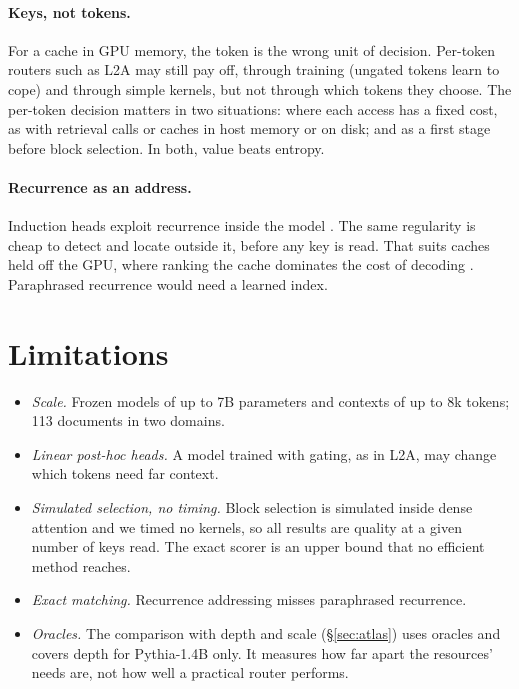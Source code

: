 \documentclass[11pt]{article}
\begin{document}
\paragraph{Keys, not tokens.} For a cache in GPU memory, the token is the wrong unit of decision. Per-token routers such as L2A may still pay off, through training (ungated tokens learn to cope) and through simple kernels, but not through which tokens they choose. The per-token decision matters in two situations: where each access has a fixed cost, as with retrieval calls or caches in host memory or on disk; and as a first stage before block selection. In both, value beats entropy.

\paragraph{Recurrence as an address.} Induction heads exploit recurrence inside the model \citep{olsson2022induction}. The same regularity is cheap to detect and locate outside it, before any key is read. That suits caches held off the GPU, where ranking the cache dominates the cost of decoding \citep{kalyanarangan2026fathom}. Paraphrased recurrence would need a learned index.

\section{Limitations}
\begin{itemize}
\item \emph{Scale.} Frozen models of up to 7B parameters and contexts of up to 8k tokens; 113 documents in two domains.
\item \emph{Linear post-hoc heads.} A model trained with gating, as in L2A, may change which tokens need far context.
\item \emph{Simulated selection, no timing.} Block selection is simulated inside dense attention and we timed no kernels, so all results are quality at a given number of keys read. The exact scorer is an upper bound that no efficient method reaches.
\item \emph{Exact matching.} Recurrence addressing misses paraphrased recurrence.
\item \emph{Oracles.} The comparison with depth and scale (\S\ref{sec:atlas}) uses oracles and covers depth for Pythia-1.4B only. It measures how far apart the resources' needs are, not how well a practical router performs.
\end{itemize}
\end{document}

